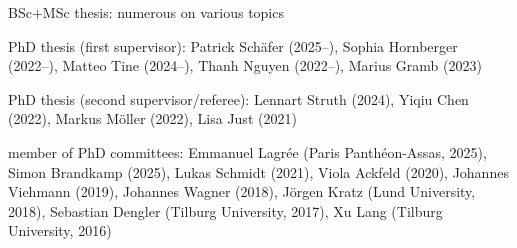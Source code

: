 \documentclass[a4paper]{article}
\renewenvironment{itemize}{
  \begin{list}{}{
    \setlength{\leftmargin}{1.5em}
  }
}{
  \end{list}
}
\begin{document}
\begin{itemize}
\item BSc+MSc thesis: numerous on various topics
\item PhD thesis (first supervisor): Patrick Sch\"afer (2025--), Sophia Hornberger (2022--), Matteo Tine (2024--), Thanh Nguyen (2022--), Marius Gramb (2023)
\item PhD thesis (second supervisor/referee):  Lennart Struth (2024), Yiqiu Chen (2022), Markus M\"oller (2022), Lisa Just (2021)
\item member of PhD committees: Emmanuel Lagr\'ee (Paris Panthéon-Assas, 2025), Simon Brandkamp (2025), Lukas Schmidt (2021), Viola Ackfeld (2020), Johannes Viehmann (2019), Johannes Wagner (2018), J\"orgen Kratz (Lund University, 2018), Sebastian Dengler (Tilburg University, 2017), Xu Lang (Tilburg University, 2016)
\end{itemize}

\end{document}
